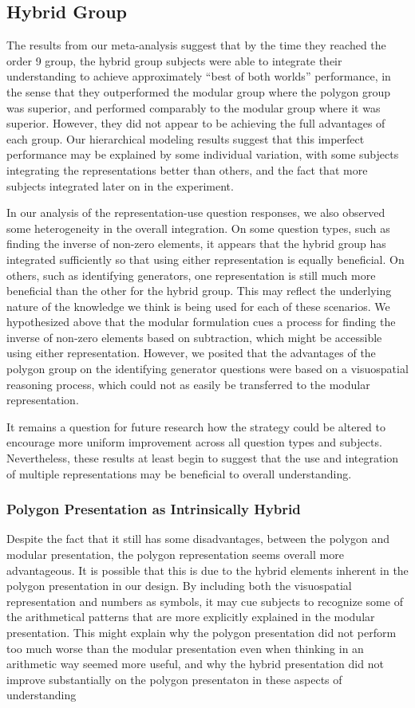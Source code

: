 \documentclass[man,10pt]{apa6}
\begin{document}
\subsection{Hybrid Group}
The results from our meta-analysis suggest that by the time they reached the order 9 group, the hybrid group subjects were able to integrate their understanding to achieve approximately ``best of both worlds'' performance, in the sense that they outperformed the modular group where the polygon group was superior, and performed comparably to the modular group where it was superior. However, they did not appear to be achieving the full advantages of each group. Our hierarchical modeling results suggest that this imperfect performance may be explained by some individual variation, with some subjects integrating the representations better than others, and the fact that more subjects integrated later on in the experiment. \par 
In our analysis of the representation-use question responses, we also observed some heterogeneity in the overall integration. On some question types, such as finding the inverse of non-zero elements, it appears that the hybrid group has integrated sufficiently so that using either representation is equally beneficial. On others, such as identifying generators, one representation is still much more beneficial than the other for the hybrid group. This may reflect the underlying nature of the knowledge we think is being used for each of these scenarios. We hypothesized above that the modular formulation cues a process for finding the inverse of non-zero elements based on subtraction, which might be accessible using either representation. However, we posited that the advantages of the polygon group on the identifying generator questions were based on a visuospatial reasoning process, which could not as easily be transferred to the modular representation. \par 
It remains a question for future research how the strategy could be altered to encourage more uniform improvement across all question types and subjects. Nevertheless, these results at least begin to suggest that the use and integration of multiple representations may be beneficial to overall understanding. 
\subsubsection{Polygon Presentation as Intrinsically Hybrid}
Despite the fact that it still has some disadvantages, between the polygon and modular presentation, the polygon representation seems overall more advantageous. It is possible that this is due to the hybrid elements inherent in the polygon presentation in our design. By including both the visuospatial representation and numbers as symbols, it may cue subjects to recognize some of the arithmetical patterns that are more explicitly explained in the modular presentation. This might explain why the polygon presentation did not perform too much worse than the modular presentation even when thinking in an arithmetic way seemed more useful, and why the hybrid presentation did not improve substantially on the polygon presentaton in these aspects of understanding 
\end{document}
